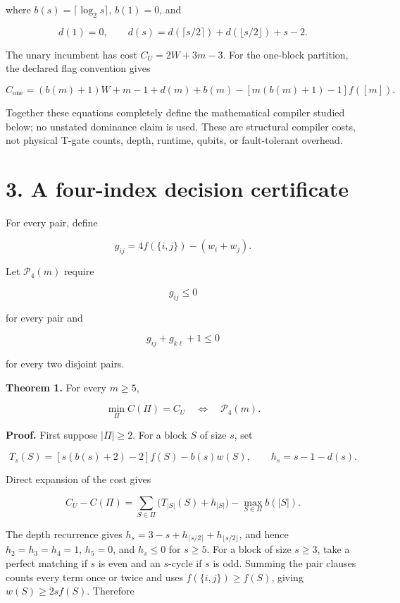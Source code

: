 \documentclass[
  11pt,
]{article}
\begin{document}
where \(b(s)=\lceil\log_2s\rceil\), \(b(1)=0\), and

\[
d(1)=0, \qquad
d(s)=d(\lceil s/2\rceil)+d(\lfloor s/2\rfloor)+s-2.
\]

The unary incumbent has cost \(C_U=2W+3m-3\). For the one-block
partition, the declared flag convention gives

\[
C_{\mathrm{one}}=(b(m)+1)W+m-1+d(m)+b(m)
-[m(b(m)+1)-1]f([m]).
\]

Together these equations completely define the mathematical compiler
studied below; no unstated dominance claim is used. These are structural
compiler costs, not physical T-gate counts, depth, runtime, qubits, or
fault-tolerant overhead.

\hypertarget{a-four-index-decision-certificate}{%
\section{3. A four-index decision
certificate}\label{a-four-index-decision-certificate}}

For every pair, define

\[
g_{ij}=4f(\{i, j\})-(w_i+w_j).
\]

Let \(\mathcal P_4(m)\) require

\[
g_{ij}\le0
\]

for every pair and

\[
g_{ij}+g_{k\ell}+1\le0
\]

for every two disjoint pairs.

\textbf{Theorem 1.} For every \(m\ge5\),

\[
\min_\Pi C(\Pi)=C_U
\quad\Longleftrightarrow\quad
\mathcal P_4(m).
\]

\textbf{Proof.} First suppose \(|\Pi|\ge2\). For a block \(S\) of size
\(s\), set

\[
T_s(S)=[s(b(s)+2)-2]f(S)-b(s)w(S),
\qquad h_s=s-1-d(s).
\]

Direct expansion of the cost gives

\[
C_U-C(\Pi)=\sum_{S\in\Pi}\bigl(T_{|S|}(S)+h_{|S|}\bigr)
-\max_{S\in\Pi}b(|S|).
\]

The depth recurrence gives
\(h_s=3-s+h_{\lceil s/2\rceil}+h_{\lfloor s/2\rfloor}\), and hence
\(h_2=h_3=h_4=1\), \(h_5=0\), and \(h_s\le0\) for \(s\ge5\). For a block
of size \(s\ge3\), take a perfect matching if \(s\) is even and an
\(s\)-cycle if \(s\) is odd. Summing the pair clauses counts every term
once or twice and uses \(f(\{i,j\})\ge f(S)\), giving
\(w(S)\ge2s f(S)\). Therefore
\end{document}
